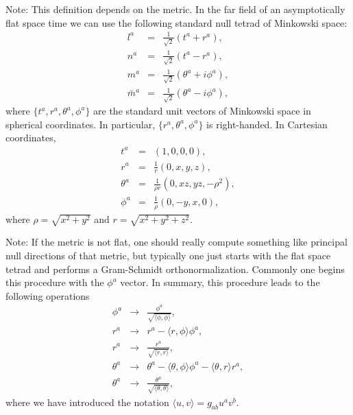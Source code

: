 \documentclass[12pt]{article}
\newcommand{\mysec}[1]{\bigskip\noindent{\bf #1}\smallskip}
\begin{document}
Note: This definition depends on the metric. In the far field of an
asymptotically flat space time we can use the following standard null
tetrad of Minkowski space:
%
\begin{eqnarray}
        l^a &=& \frac{1}{\sqrt{2}} (t^a + r^a), \\
        n^a &=& \frac{1}{\sqrt{2}} (t^a - r^a), \\
        m^a &=& \frac{1}{\sqrt{2}} (\theta^a + i \phi^a), \\
  \bar{m}^a &=& \frac{1}{\sqrt{2}} (\theta^a - i \phi^a),
\end{eqnarray}
%
where $\{t^a,r^a,\theta^a,\phi^a\}$ are the standard unit vectors of
Minkowski space in spherical coordinates. In particular,
$\{r^a,\theta^a,\phi^a\}$ is right-handed. In Cartesian coordinates,
%
\begin{eqnarray}
        t^a &=& (1,0,0,0), \\
        r^a &=& \frac{1}{r} (0,x,y,z), \\
        \theta^a &=& \frac{1}{\rho r} (0, x z, y z, - \rho^2), \\
        \phi^a &=& \frac{1}{\rho} (0, -y, x, 0),
\end{eqnarray}
%
where $\rho=\sqrt{x^2+y^2}$ and $r=\sqrt{x^2+y^2+z^2}$.

Note: If the metric is not flat, one should really compute something
like principal null directions of that metric, but typically one just
starts with the flat space tetrad and performs a Gram-Schmidt
orthonormalization. Commonly one begins this procedure with the $\phi^a$
vector. In summary, this procedure leads to the following operations
%
\begin{eqnarray}
  \phi^a   &\rightarrow& \frac{\phi^a}{\sqrt{\langle \phi,\phi\rangle}}, \\
  r^a      &\rightarrow& r^a - \langle r, \phi \rangle \phi^a, \\
  r^a      &\rightarrow& \frac{r^a}{\sqrt{\langle r,r\rangle}}, \\
  \theta^a &\rightarrow& \theta^a - \langle \theta, \phi \rangle \phi^a
                                  - \langle \theta, r \rangle r^a, \\
  \theta^a &\rightarrow& \frac{\theta^a}{\sqrt{\langle \theta, \theta
                         \rangle}},
\end{eqnarray}
%
where we have introduced the notation $\langle u, v \rangle = g_{ab}u^a v^b$.




\mysec{Symmetry properties of $\psi_4$}
\end{document}
